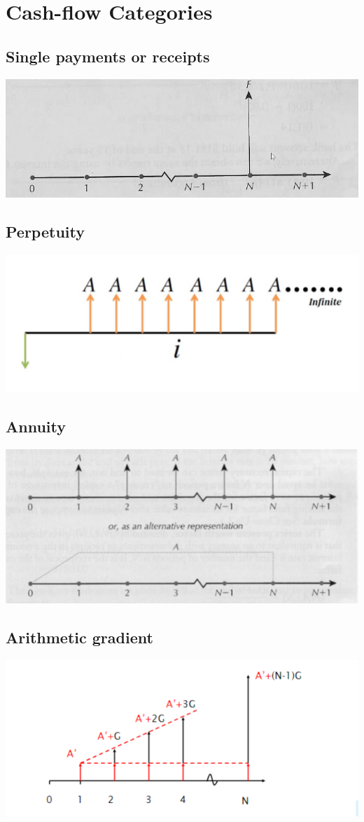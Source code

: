 \documentclass{article}
\begin{document}
\section*{Cash-flow Categories}

\subsection*{Single payments or receipts}
\begin{center}
    \includegraphics[width=0.5\linewidth]{W2V2_1.png}
\end{center}

\subsection*{Perpetuity}
\begin{center}
    \includegraphics[width=0.5\linewidth]{W2V2_2.png}
\end{center}

\subsection*{Annuity}
\begin{center}
    \includegraphics[width=0.5\linewidth]{W2V2_3.png}
\end{center}
\subsection*{Arithmetic gradient}
\begin{center}
    \includegraphics[width=0.5\linewidth]{W2V2_4.png}
\end{center}
\end{document}

